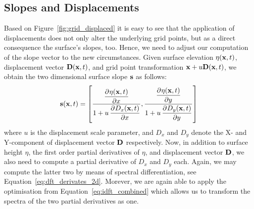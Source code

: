 \subsection{Slopes and Displacements}
%
Based on Figure~\ref{fig:grid_displaced} it is easy to see that the application 
of displacements does not only alter the underlying grid points, but as a 
direct consequence the surface's slopes, too. Hence, we need to adjust our 
computation of the slope vector to the new circumstances. Given surface 
elevation $\eta(\mathbf{x},t)$, displacement vector $\mathbf{D}(\mathbf{x},t)$,
and grid point transformation  $\mathbf{x} + u\mathbf{D}(\mathbf{x},t)$, we obtain the
two dimensional surface slope
$\mathbf{s}$ as follows:
\begin{equation}
\mvec{s}(\mvec{x},t) = \left[\frac{\dpd{\eta(\mvec{x},t)}{x}}{1 + u 
\dpd{D_x(\mvec{x},t)}{x}}, \frac{\dpd{\eta(\mvec{x},t)}{y}}{1 + u 
\dpd{D_y(\mvec{x},t)}{y}}\right]
\end{equation}
where $u$ is the displacement scale parameter, and $D_x$ and $D_y$ denote the X-
and Y-component of displacement vector $\mathbf{D}$ respectively. Now, in addition
to surface height $\eta$, the first order partial derivatives of $\eta$, and
displacement vector $\mathbf{D}$, we also need to compute a partial derivative of
$D_x$ and $D_y$ each. Again, we may compute the latter two by means of spectral
differentiation, see Equation~\ref{eq:dft_derivates_2d}. Morever, we are again
able to apply the optimisation from Equation~\ref{eq:idft_combined} which allows
us to transform the spectra of the two partial derivatives as one.
%
